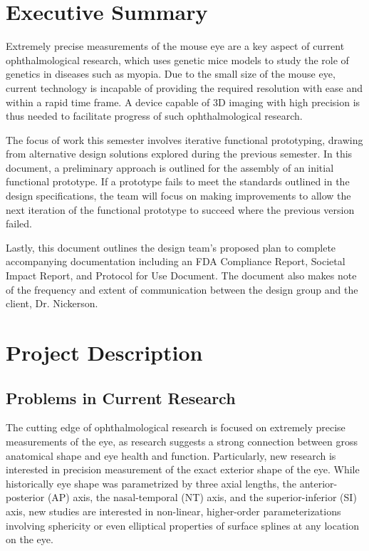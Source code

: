\documentclass{article}
\begin{document}

\setcounter{tocdepth}{2}
\tableofcontents
\newpage
\listoftables
\listoffigures
\newpage


\section*{Executive Summary}
\label{sec:exec-summary}
Extremely precise measurements of the mouse eye are a key aspect of current ophthalmological research, which uses genetic mice models to study the role of genetics in diseases such as myopia. Due to the small size of the mouse eye, current technology is incapable of providing the required resolution with ease and within a rapid time frame. A device capable of 3D imaging with high precision is thus needed to facilitate progress of such ophthalmological research. 

The focus of work this semester involves iterative functional prototyping, drawing from alternative design solutions explored during the previous semester. In this document, a preliminary approach is outlined for the assembly of an initial functional prototype. If a prototype fails to meet the standards outlined in the design specifications, the team will focus on making improvements to allow the next iteration of the functional prototype to succeed where the previous version failed. 

Lastly, this document outlines the design team's proposed plan to complete accompanying documentation including an FDA Compliance Report, Societal Impact Report, and Protocol for Use Document. The document also makes note of the frequency and extent of communication between the design group and the client, Dr. Nickerson.

\newpage

\section{Project Description}
\label{sec:project-description}

\subsection{Problems in Current Research}
\label{sec:probl-curr-rese}

The cutting edge of ophthalmological research is focused on extremely precise measurements of the eye, as research suggests a strong connection between gross anatomical shape and eye health and function. Particularly, new research is interested in precision measurement of the exact exterior shape of the eye.\cite{atchison04,zhou99:genes,zhou99:models,guggenheim04,wallman04} While historically eye shape was parametrized by three axial lengths, the anterior-posterior (AP) axis, the nasal-temporal (NT) axis, and the superior-inferior (SI) axis, new studies are interested in non-linear, higher-order parameterizations involving sphericity or even elliptical properties of surface splines at any location on the eye.
\end{document}
